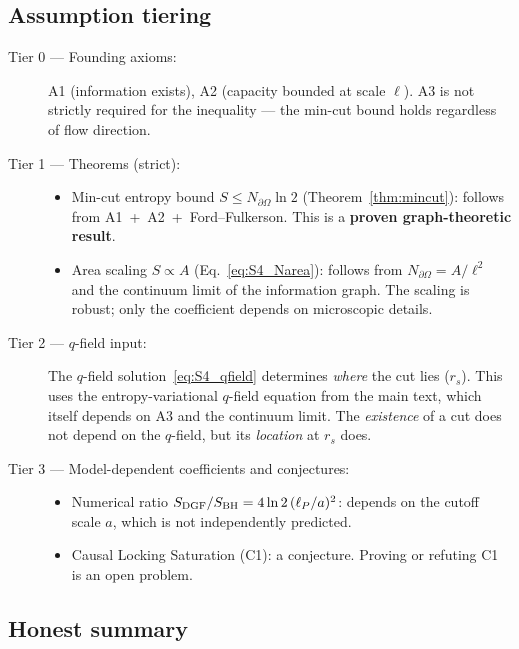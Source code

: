 \documentclass[aps,prd,twocolumn,superscriptaddress,nofootinbib,floatfix]{revtex4-2}
\begin{document}
\subsection{Assumption tiering}

\begin{description}
  \item[Tier 0 --- Founding axioms:]
    A1 (information exists), A2 (capacity bounded at scale $\ell$).
    A3 is not strictly required for the inequality --- the min-cut bound
    holds regardless of flow direction.

  \item[Tier 1 --- Theorems (strict):]
    \begin{itemize}
      \item Min-cut entropy bound $S\le N_{\partial\Omega}\ln 2$
        (Theorem~\ref{thm:mincut}): follows from A1~+~A2~+~Ford--Fulkerson.
        This is a \textbf{proven graph-theoretic result}.
      \item Area scaling $S\propto A$ (Eq.~\ref{eq:S4_Narea}): follows from
        $N_{\partial\Omega}=A/\ell^2$ and the continuum limit of the
        information graph.  The scaling is robust; only the coefficient
        depends on microscopic details.
    \end{itemize}

  \item[Tier 2 --- $q$-field input:]
    The $q$-field solution~\eqref{eq:S4_qfield} determines \emph{where}
    the cut lies ($r_s$).  This uses the entropy-variational $q$-field
    equation from the main text, which itself depends on A3 and the
    continuum limit.  The \emph{existence} of a cut does not depend on the
    $q$-field, but its \emph{location} at $r_s$ does.

  \item[Tier 3 --- Model-dependent coefficients and conjectures:]
    \begin{itemize}
      \item Numerical ratio $S_{\rm DGF}/S_{\rm BH}=4\ln 2\,(\ell_P/a)^2$:
        depends on the cutoff scale $a$, which is not independently
        predicted.
      \item Causal Locking Saturation (C1): a conjecture.  Proving or
        refuting C1 is an open problem.
    \end{itemize}
\end{description}

\subsection{Honest summary}
\end{document}
